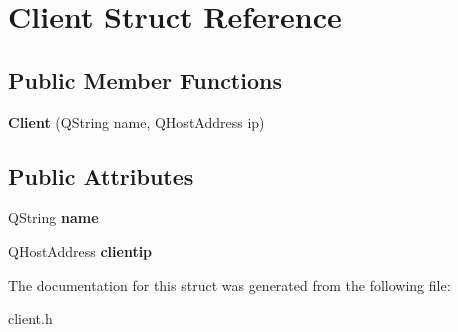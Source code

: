 \hypertarget{struct_client}{}\section{Client Struct Reference}
\label{struct_client}
\subsection*{Public Member Functions}
\begin{DoxyCompactItemize}
\item 
\hypertarget{struct_client_aec392ac2f5d38da1014c2686d14d7899}{}{\bfseries Client} (Q\+String name, Q\+Host\+Address ip)\label{struct_client_aec392ac2f5d38da1014c2686d14d7899}

\end{DoxyCompactItemize}
\subsection*{Public Attributes}
\begin{DoxyCompactItemize}
\item 
\hypertarget{struct_client_ab4c2a9544fdb3b950270ef57235440c1}{}Q\+String {\bfseries name}\label{struct_client_ab4c2a9544fdb3b950270ef57235440c1}

\item 
\hypertarget{struct_client_afc6b3e75c66f08edd6bf77d4b561dfc4}{}Q\+Host\+Address {\bfseries clientip}\label{struct_client_afc6b3e75c66f08edd6bf77d4b561dfc4}

\end{DoxyCompactItemize}


The documentation for this struct was generated from the following file\+:\begin{DoxyCompactItemize}
\item 
client.\+h\end{DoxyCompactItemize}
